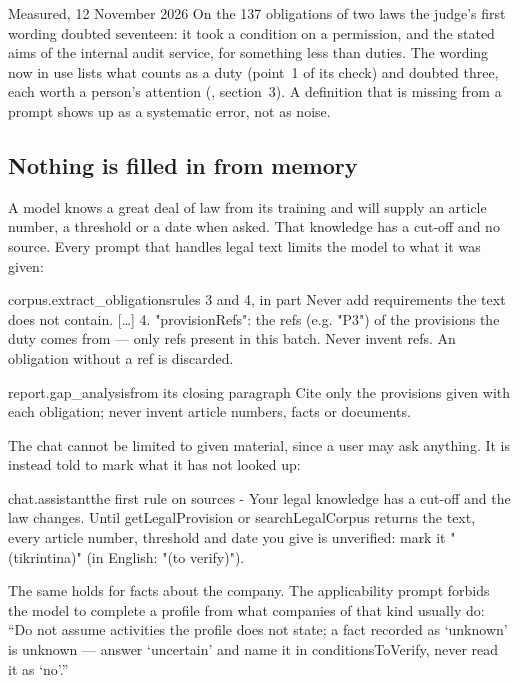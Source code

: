 \begin{lessonbox}{Measured, 12 November 2026}
On the 137 obligations of two laws the judge's first wording doubted seventeen: it took a
condition on a permission, and the stated aims of the internal audit service, for something
less than duties. The wording now in use lists what counts as a duty (point~1 of its check)
and doubted three, each worth a person's attention (, section~3).
A definition that is missing from a prompt shows up as a systematic error, not as noise.
\end{lessonbox}

\subsection{Nothing is filled in from memory}

A model knows a great deal of law from its training and will supply an article number, a
threshold or a date when asked. That knowledge has a cut-off and no source. Every prompt that
handles legal text limits the model to what it was given:

\begin{promptexcerpt}{corpus.extract_obligations}{rules 3 and 4, in part}
Never add
   requirements the text does not contain.
[…]
4. "provisionRefs": the refs (e.g. "P3") of the provisions the duty comes from —
   only refs present in this batch. Never invent refs. An obligation without a ref
   is discarded.
\end{promptexcerpt}

\begin{promptexcerpt}{report.gap_analysis}{from its closing paragraph}
Cite only the provisions given with each obligation; never invent article
numbers, facts or documents.
\end{promptexcerpt}

The chat cannot be limited to given material, since a user may ask anything. It is instead
told to mark what it has not looked up:

\begin{promptexcerpt}{chat.assistant}{the first rule on sources}
- Your legal knowledge has a cut-off and the law changes. Until getLegalProvision or searchLegalCorpus returns the text, every article number, threshold and date you give is unverified: mark it "(tikrintina)" (in English: "(to verify)").
\end{promptexcerpt}

The same holds for facts about the company. The applicability prompt forbids the model to
complete a profile from what companies of that kind usually do: \enquote{Do not assume
activities the profile does not state; a fact recorded as \enquote{unknown} is unknown — answer
\enquote{uncertain} and name it in conditionsToVerify, never read it as \enquote{no}.}

